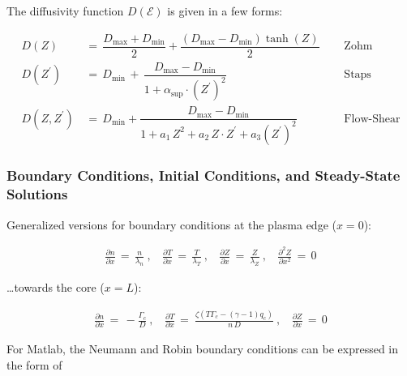 \documentclass[a4paper,8pt]{article}
\begin{document}
\normalsize

The diffusivity function \(D(\mathcal{E})\) is given in a few forms:
\small

\begin{align}
    D(Z) \,&=\, \dfrac{D_\text{max} + D_\text{min}}{2} + \dfrac{(D_\text{max} - D_\text{min})\tanh(Z)}{2} ~~~~~~ &\text{Zohm} \\
    D(Z^\prime) \,&=\, D_\text{min} \,+\, \dfrac{D_\text{max} - D_\text{min}}{1 + \alpha_\text{sup}\cdot(Z^\prime)^2} ~~~~~~ &\text{Staps} \\
    D(Z, Z^\prime) \,&=\, D_\text{min} + \dfrac{D_\text{max} - D_\text{min}}{1 + a_1\,Z^2 + a_2\,Z \cdot Z^\prime + a_3\left(Z^\prime\right)^2} ~~~~~~ &\text{Flow-Shear}
\end{align}

\normalsize

\subsubsection{Boundary Conditions, Initial Conditions, and Steady-State
Solutions}\label{boundary-conditions-initial-conditions-and-steady-state-solutions}

Generalized versions for boundary conditions at the plasma edge
(\(x=0\)): \small

\begin{align}
    \frac{\partial n}{\partial x} \,=\, \frac{n}{\lambda_n}~, ~~~~\frac{\partial T}{\partial x} \,=\, \frac{T}{\lambda_T}~, ~~~~\frac{\partial Z}{\partial x} \,=\, \frac{Z}{\lambda_Z}~,~~~~ \frac{\partial^2 Z}{\partial x^2} \,=\, 0
\end{align}

\normalsize

\ldots{}towards the core (\(x=L\)): \small

\begin{align}
    \frac{\partial n}{\partial x} \,=\, -\frac{\Gamma_c}{D}~, ~~~~ \frac{\partial T}{\partial x} \,=\ \frac{\zeta\left(T \Gamma_c - (\gamma - 1) q_c\right)}{n\,D}~, ~~~~\frac{\partial Z}{\partial x} \,=\, 0
\end{align}

\normalsize

For Matlab, the Neumann and Robin boundary conditions can be expressed
in the form of \small
\end{document}
